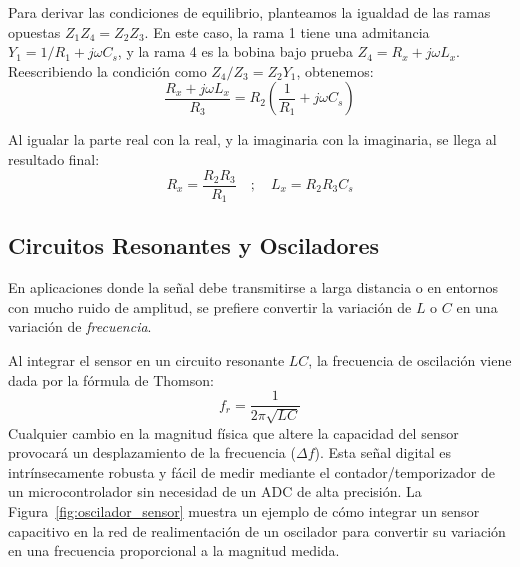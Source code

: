 Para derivar las condiciones de equilibrio, planteamos la igualdad de las ramas opuestas $Z_1 Z_4 = Z_2 Z_3$. En este caso, la rama 1 tiene una admitancia $Y_1 = 1/R_1 + j\omega C_s$, y la rama 4 es la bobina bajo prueba $Z_4 = R_x + j\omega L_x$. Reescribiendo la condición como $Z_4 / Z_3 = Z_2 Y_1$, obtenemos:
\begin{equation}
    \frac{R_x + j\omega L_x}{R_3} = R_2 \left( \frac{1}{R_1} + j\omega C_s \right)
\end{equation}

Al igualar la parte real con la real, y la imaginaria con la imaginaria, se llega al resultado final:
\begin{equation}
    R_x = \frac{R_2 R_3}{R_1} \quad ; \quad L_x = R_2 R_3 C_s
\end{equation}


\subsection{Circuitos Resonantes y Osciladores}

En aplicaciones donde la señal debe transmitirse a larga distancia o en entornos con mucho ruido de amplitud, se prefiere convertir la variación de $L$ o $C$ en una variación de \emph{frecuencia}. 

Al integrar el sensor en un circuito resonante $LC$, la frecuencia de oscilación viene dada por la fórmula de Thomson:
\begin{equation}
    f_r = \frac{1}{2\pi \sqrt{LC}}
\end{equation}
Cualquier cambio en la magnitud física que altere la capacidad del sensor provocará un desplazamiento de la frecuencia ($\Delta f$). Esta señal digital es intrínsecamente robusta y fácil de medir mediante el contador/temporizador de un microcontrolador sin necesidad de un ADC de alta precisión. La Figura~\ref{fig:oscilador_sensor} muestra un ejemplo de cómo integrar un sensor capacitivo en la red de realimentación de un oscilador para convertir su variación en una frecuencia proporcional a la magnitud medida.

